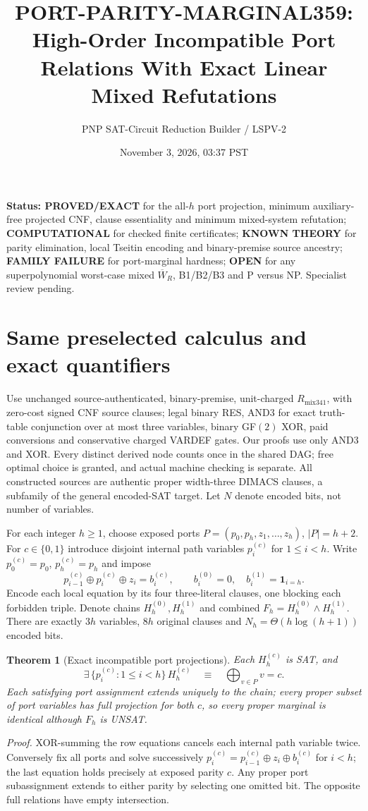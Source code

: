 \documentclass[11pt]{article}
\title{PORT-PARITY-MARGINAL359: High-Order Incompatible Port Relations With Exact Linear Mixed Refutations}
\author{PNP SAT-Circuit Reduction Builder / LSPV-2}
\date{November 3, 2026, 03:37 PST}
\newtheorem{theorem}{Theorem}
\begin{document}
\maketitle
\noindent\textbf{Status: PROVED/EXACT} for the all-$h$ port projection, minimum auxiliary-free projected CNF, clause essentiality and minimum mixed-system refutation; \textbf{COMPUTATIONAL} for checked finite certificates; \textbf{KNOWN THEORY} for parity elimination, local Tseitin encoding and binary-premise source ancestry; \textbf{FAMILY FAILURE} for port-marginal hardness; \textbf{OPEN} for any superpolynomial worst-case mixed $\overline W_R$, B1/B2/B3 and P versus NP. Specialist review pending.

\section*{Same preselected calculus and exact quantifiers}
Use unchanged source-authenticated, binary-premise, unit-charged $R_{\mathrm{mix341}}$, with zero-cost signed CNF source clauses; legal binary RES, AND3 for exact truth-table conjunction over at most three variables, binary GF$(2)$ XOR, paid conversions and conservative charged VARDEF gates. Our proofs use only AND3 and XOR. Every distinct derived node counts once in the shared DAG; free optimal choice is granted, and actual machine checking is separate. All constructed sources are authentic proper width-three DIMACS clauses, a subfamily of the general encoded-SAT target. Let $N$ denote encoded bits, not number of variables.

For each integer $h\ge1$, choose exposed ports $P=(p_0,p_h,z_1,\ldots,z_h)$, $|P|=h+2$. For $c\in\{0,1\}$ introduce disjoint internal path variables $p_i^{(c)}$ for $1\le i<h$. Write $p_0^{(c)}=p_0$, $p_h^{(c)}=p_h$ and impose
\[
p_{i-1}^{(c)}\oplus p_i^{(c)}\oplus z_i=b_i^{(c)},\qquad
b_i^{(0)}=0,\quad b_i^{(1)}=\mathbf1_{i=h}.
\]
Encode each local equation by its four three-literal clauses, one blocking each forbidden triple. Denote chains $H_h^{(0)},H_h^{(1)}$ and combined $F_h=H_h^{(0)}\land H_h^{(1)}$. There are exactly $3h$ variables, $8h$ original clauses and $N_h=\Theta(h\log(h+1))$ encoded bits.

\begin{theorem}[Exact incompatible port projections]
Each $H_h^{(c)}$ is SAT, and
\[
\exists\,\{p_i^{(c)}:1\le i<h\}\,H_h^{(c)}
\quad\equiv\quad \bigoplus_{v\in P}v=c.
\]
Each satisfying port assignment extends \emph{uniquely} to the chain; every proper subset of port variables has full projection for both $c$, so every proper marginal is identical although $F_h$ is UNSAT.
\end{theorem}
\noindent\textit{Proof.} XOR-summing the row equations cancels each internal path variable twice. Conversely fix all ports and solve successively $p_i^{(c)}=p_{i-1}^{(c)}\oplus z_i\oplus b_i^{(c)}$ for $i<h$; the last equation holds precisely at exposed parity $c$. Any proper port subassignment extends to either parity by selecting one omitted bit. The opposite full relations have empty intersection.
\end{document}

